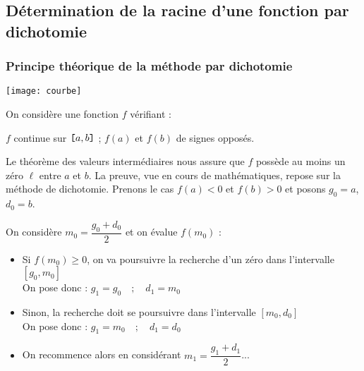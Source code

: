 \subsection{Détermination de la racine d'une fonction par dichotomie}

\subsubsection{Principe théorique de la méthode par dichotomie}
%
\begin{marginfigure}
\texttt{[image: courbe]}
\end{marginfigure}
% 
On considère une fonction $f$ vérifiant : 
\begin{center} $f$ continue sur $\verb![!a,b\verb!]!$ ;  $f(a)$ et $f(b)$ de signes opposés.
\end{center} Le théorème des valeurs intermédiaires nous assure que $f$ possède au moins un zéro $\ell$ entre $a$ et $b$. La preuve, vue en cours de mathématiques, repose sur la méthode de dichotomie. Prenons le cas $f(a)<0$ et $f(b)>0$ et posons $g_0=a$, $d_0=b$. 


 On considère $m_0 = \dfrac{g_0+d_0}{2}$ et on évalue $f(m_0)$ : 
\begin{itemize}
 \item Si $f(m_0)\geq 0$, on va poursuivre la recherche d'un zéro dans l'intervalle  {$[g_0,m_0]$} \\On pose donc  : 
 $g_1 =  {g_0} \quad ;\quad  d_1 =  {m_0}$\vspace*{2mm}
  \item Sinon,  la recherche doit se poursuivre  dans l'intervalle  {$[m_0,d_0]$} \\ On pose donc  : 
 $g_1 =  {m_0} \quad ; \quad d_1 =  {d_0}$\vspace*{2mm}
 \item On recommence alors en considérant $m_1 = \dfrac{g_1+d_1}{2}$...\\
 \end{itemize}

%
%
%
% 
%
%


